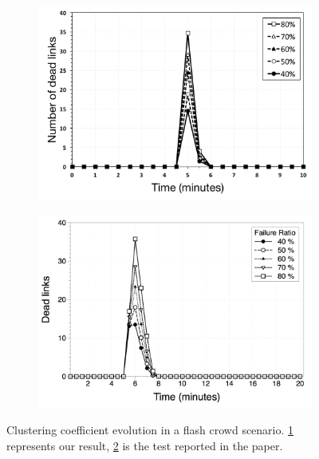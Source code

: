 
\begin{figure}
\centering
\begin{subfigure}{.5\textwidth}
  \centering
  \includegraphics[keepaspectratio=true, width=1\linewidth]{images/average_dead_links}
  \caption{}
  \label{fig:average_dead_links}
\end{subfigure}%
\begin{subfigure}{.5\textwidth}
  \centering
  \includegraphics[keepaspectratio=true, width=1\linewidth]{images/paper_average_dead_links}
  \caption{}
  \label{fig:paper_average_dead_links}
\end{subfigure}
\caption{Clustering coefficient evolution in a flash crowd scenario. \ref{fig:average_dead_links} represents our result, \ref{fig:paper_average_dead_links} is the test reported in the paper.}
\label{fig:robustness_dead_links_failures}
\end{figure}

